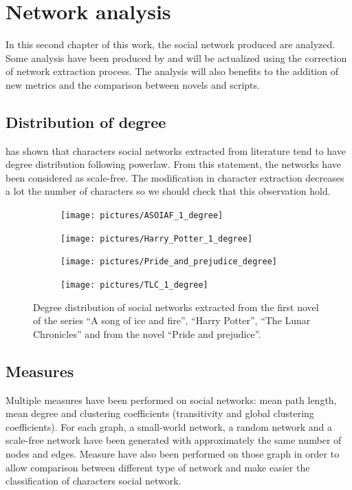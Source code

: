 \documentclass[a4paper, 12pt]{report}
\begin{document}
\chapter{Network analysis}
In this second chapter of this work, the social network produced are analyzed. Some analysis have been produced by \cite{original} and will be actualized using the correction of network extraction process. The analysis will also benefits to the addition of new metrics and the comparison between novels and scripts.

\section{Distribution of degree}
\cite{original} has shown that characters social networks extracted from literature tend to have degree distribution following powerlaw. From this statement, the networks have been considered as scale-free. The modification in character extraction decreases a lot the number of characters so we should check that this observation hold.

\begin{figure}
\begin{subfigure}{.25\textwidth}
\centering
\texttt{[image: pictures/ASOIAF\_1\_degree]}
\end{subfigure}
\hfill
\begin{subfigure}{.25\textwidth}
\centering
\texttt{[image: pictures/Harry\_Potter\_1\_degree]}
\end{subfigure}
\hfill
\begin{subfigure}{.25\textwidth}
\centering
\texttt{[image: pictures/Pride\_and\_prejudice\_degree]}
\end{subfigure}
\begin{subfigure}{.25\textwidth}
\centering

\texttt{[image: pictures/TLC\_1\_degree]}
\end{subfigure}
\caption{Degree distribution of social networks extracted from the first novel of the series ``A song of ice and fire'', ``Harry Potter'', ``The Lunar Chronicles'' and from  the novel ``Pride and prejudice''.}
\end{figure}

\section{Measures}
Multiple measures have been performed on social networks: mean path length, mean degree and clustering coefficients (transitivity and global clustering coefficients). For each graph, a small-world network, a random network and a scale-free network have been generated with approximately the same number of nodes and edges. Measure have also been performed on those graph in order to allow comparison between different type of network and make easier the classification of characters social network.\\
\end{document}

